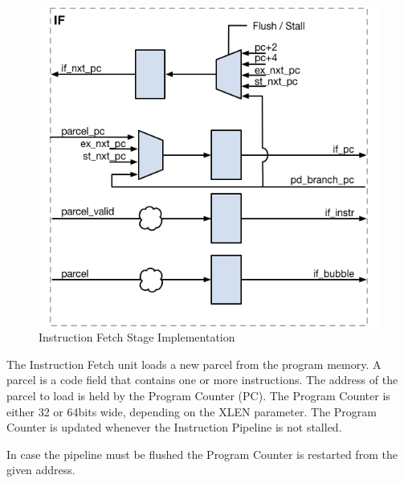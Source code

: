 \begin{figure}[h]
  \includegraphics{assets/img/Pipeline-IF.png}
  \caption{Instruction Fetch Stage Implementation}
\end{figure}

The Instruction Fetch unit loads a new parcel from the program memory.
A parcel is a code field that contains one or more instructions. The address of the parcel to load is held by the Program Counter (PC). The Program Counter is either 32 or 64bits wide, depending on the XLEN parameter. The Program Counter is updated whenever the Instruction Pipeline is not stalled.

In case the pipeline must be flushed the Program Counter is restarted from the given address.


